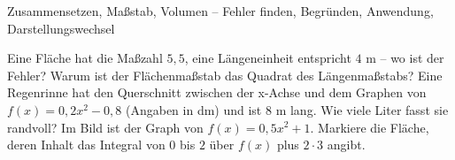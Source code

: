 \begin{aufgabe}{Zusammensetzen, Maßstab, Volumen – Fehler finden, Begründen, Anwendung, Darstellungswechsel}
\begin{teile}
\teil Eine Fläche hat die Maßzahl $5{,}5$, eine Längeneinheit entspricht $4$ m – wo ist der Fehler? 
\teil Warum ist der Flächenmaßstab das Quadrat des Längenmaßstabs?
\teil Eine Regenrinne hat den Querschnitt zwischen der x-Achse und dem Graphen von $f(x) = 0{,}2x^2 - 0{,}8$ (Angaben in dm) und ist $8$ m lang. Wie viele Liter fasst sie randvoll?
\teil Im Bild ist der Graph von $f(x) = 0{,}5x^2 + 1$. Markiere die Fläche, deren Inhalt das Integral von $0$ bis $2$ über $f(x)$ plus $2 \cdot 3$ angibt.

\begin{ksys}[xmin=-1,xmax=5,ymin=-1,ymax=5,ablesen]\end{ksys}
\end{teile}
\end{aufgabe}
